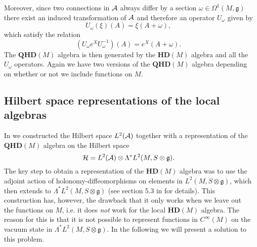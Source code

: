 \documentclass[letterpaper,11pt]{article}
\def\oo{\omega}
\def\ca{{\cal A}}
\def\ch{{\cal H}}
\begin{document}
Moreover, since two connections in $\ca$ always differ by a section $\omega \in \Omega^1(M,\mathfrak{g})$ there exist an induced transformation of $\ca$ and therefore an operator $U_\omega $ given by   
$$U_\omega (\xi )(A) = \xi (A + \omega) ,$$ 
%
%
which satisfy the relation 
\begin{equation} \label{konj}
(U_{\omega} e^X U_{ \omega}^{-1}) (A) = e^X (A + \omega )  .
\end{equation}
The $\mathbf{QHD}(M)$ algebra is then generated by the $\mathbf{HD}(M)$ algebra and all the $U_\oo$ operators. Again we have two versions of the $\mathbf{QHD}(M)$ algebra depending on whether or not we include functions on $M$.










\subsection{Hilbert space representations of the local algebras}



In \cite{Aastrup:2019yui} we constructed the Hilbert space $L^2(\ca)$ together with a representation of the $\mathbf{QHD}(M)$ algebra on the Hilbert space 
$$
\ch=L^2(\ca)\otimes \Lambda^*L^2(M,S\otimes\mathfrak{g}).
$$ 
The key step to obtain a representation of the $\mathbf{HD}(M)$ algebra was to use the adjoint action of holonomy-diffeomorphisms on elements in $L^2(M,S\otimes\mathfrak{g})$, which then extends to $\Lambda^*L^2(M,S\otimes\mathfrak{g})$ (see section 5.3 in \cite{Aastrup:2019yui} for details). 
This construction has, however, the drawback that it only works when we leave out the functions on $M$, i.e. it does {\it not} work for the local $\mathbf{HD}(M)$ algebra. The reason for this is that it is not possible to represent functions in $C^\infty(M)$ on the vacuum state in $\Lambda^*L^2(M,S\otimes\mathfrak{g})$. In the following we will present a solution to this problem.
\end{document}
